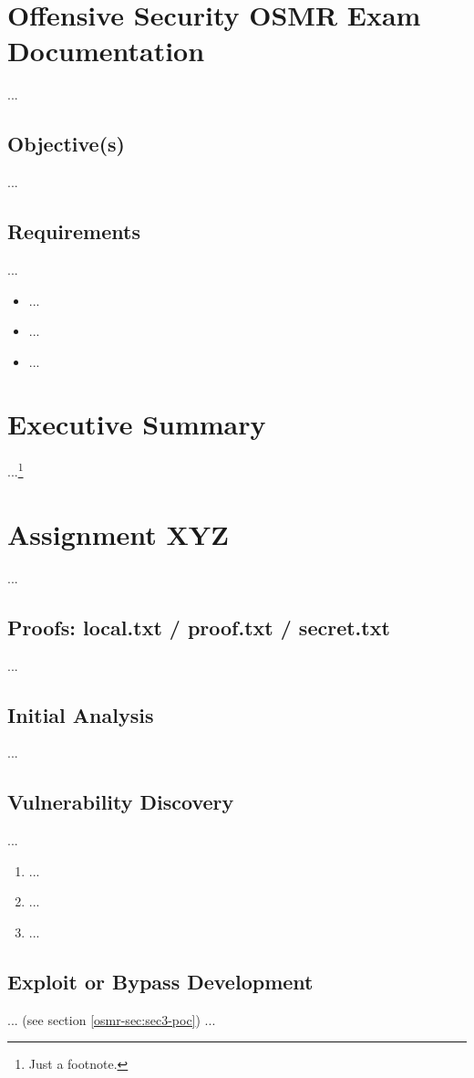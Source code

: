 %
%
%
\section{Offensive Security OSMR Exam Documentation}\label{osmr-sec:sec1}
%
...
%
%
%
\subsection{Objective(s)}\label{osmr-sec:sec1-obj}
%
...
%
%
%
\subsection{Requirements}\label{osmr-sec:sec1-req}
%
...

\begin{itemize}
    \item ...
    \item ...
    \item ...
\end{itemize}
%
%
%
\section{Executive Summary}\label{osmr-sec:sec2}
%
...\footnote{Just a footnote.}
%
%
%
\section{Assignment XYZ}\label{osmr-sec:sec3}
%
...
%
%
%
\subsection{Proofs: local.txt / proof.txt / secret.txt}\label{osmr-sec:sec3-proofs}
%
...
%
%
%
\subsection{Initial Analysis}\label{osmr-sec:sec3-init}
%
...
%
%
%
\subsection{Vulnerability Discovery}\label{osmr-sec:sec3-vuln}
%
...

\begin{enumerate}
    \item ...
    \item ...
    \item ...
\end{enumerate}
%
%
%
\subsection{Exploit or Bypass Development}\label{osmr-sec:sec3-expl}
%
... (see section \ref{osmr-sec:sec3-poc}) ...
%
%
%
